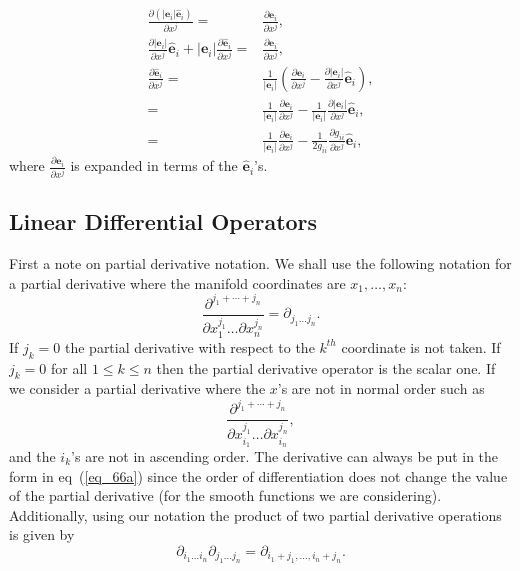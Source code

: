 \documentclass[12pt]{report}
\newcommand{\bm}[1]{\boldsymbol{#1}}
\newcommand{\bfrac}[2]{\displaystyle\frac{#1}{#2}}
\newcommand{\lp}{\left (}
\newcommand{\rp}{\right )}
\newcommand{\abs}[1]{\left |{#1}\right |}
\newcommand{\pdiff}[2]{\bfrac{\partial {#1}}{\partial {#2}}}
\newcommand{\paren}[1]{\lp {#1} \rp}
\newcommand{\be}{\begin{equation}}
\newcommand{\ee}{\end{equation}}
\begin{document}
\begin{align}
    \pdiff{\paren{\abs{\bm{e}_{i}}\bm{\hat{e}}_{i}}}{x^{j}} =& \pdiff{\bm{e}_{i}}{x^{j}}, \nonumber \\
    \pdiff{\abs{\bm{e}_{i}}}{x^{j}}\bm{\hat{e}}_{i}
                                      +\abs{\bm{e}_{i}}\pdiff{\bm{\hat{e}}_{i}}{x^{j}} =& \pdiff{\bm{e}_{i}}{x^{j}}, \nonumber \\
    \pdiff{\bm{\hat{e}}_{i}}{x^{j}} =& \bfrac{1}{\abs{\bm{e}_{i}}}\paren{\pdiff{\bm{e}_{i}}{x^{j}}
                                       -\pdiff{\abs{\bm{e}_{i}}}{x^{j}}\bm{\hat{e}}_{i}},\nonumber \\
                                    =& \bfrac{1}{\abs{\bm{e}_{i}}}\pdiff{\bm{e}_{i}}{x^{j}}
                                       -\bfrac{1}{\abs{\bm{e}_{i}}}\pdiff{\abs{\bm{e}_{i}}}{x^{j}}\bm{\hat{e}}_{i},\nonumber \\
                                    =& \bfrac{1}{\abs{\bm{e}_{i}}}\pdiff{\bm{e}_{i}}{x^{j}}
                                       -\bfrac{1}{2g_{ii}}\pdiff{g_{ii}}{x^{j}}\bm{\hat{e}}_{i},
\end{align}
where $\pdiff{\bm{e}_{i}}{x^{j}}$ is expanded in terms of the $\bm{\hat{e}}_{i}$'s.

\subsection{Linear Differential Operators}\label{ldops}

First a note on partial derivative notation.  We shall use the following notation for a partial derivative where
the manifold coordinates are $x_{1},\dots,x_{n}$:
\be\label{eq_66a}
    \bfrac{\partial^{j_{1}+\cdots+j_{n}}}{\partial x_{1}^{j_{1}}\dots\partial x_{n}^{j_{n}}} = \partial_{j_{1}\dots j_{n}}.
\ee
If $j_{k}=0$ the partial derivative with respect to the $k^{th}$ coordinate is not taken.  If $j_{k} = 0$ for all
$1 \le k \le n$ then the partial derivative operator is the scalar one.  If we consider a partial derivative where the $x$'s are
not in normal order such as
\begin{equation*}
    \bfrac{\partial^{j_{1}+\cdots+j_{n}}}{\partial x_{i_{1}}^{j_{1}}\dots\partial x_{i_{n}}^{j_{n}}},
\end{equation*}
and the $i_{k}$'s are not in ascending order.  The derivative can always be  put in the form in eq~(\ref{eq_66a}) since the order
of differentiation does not change the value of the partial derivative (for the smooth functions we are considering).
Additionally, using our notation the product of two partial derivative operations is given by
\be
    \partial_{i_{1}\dots i_{n}}\partial_{j_{1}\dots j_{n}} = \partial_{i_{1}+j_{1},\dots, i_{n}+j_{n}}.
\ee
\end{document}

